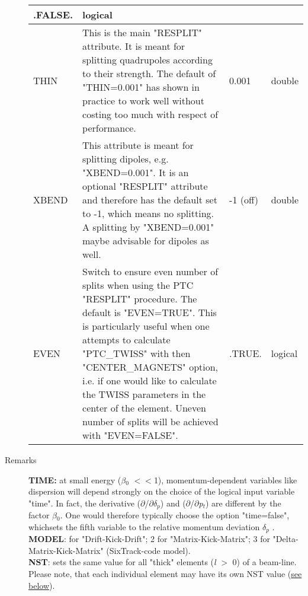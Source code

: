 \begin{description}
\begin{longtable}{l p{8cm} p{2cm} p{2cm}}
.FALSE. & logical \\
\hline
 THIN & 
   This is the main "RESPLIT" attribute. It is meant        for splitting quadrupoles according to their strength. The default        of "THIN=0.001" has shown in practice to        work well without costing too much with respect of performance.  & 
0.001 & double \\
\hline
XBEND & 
   This attribute is meant for splitting dipoles, e.g. "XBEND=0.001". It is an optional "RESPLIT" attribute and therefore has the        default set to -1, which means no splitting. A splitting by "XBEND=0.001" maybe advisable for dipoles        as well.  & 
-1 (off) & double \\
\hline
 EVEN & 
  Switch to ensure even number of splits when using the PTC "RESPLIT" procedure. The default is "EVEN=TRUE". This is particularly useful        when one attempts to calculate "PTC\_TWISS" with then "CENTER\_MAGNETS" option, i.e. if one        would like to calculate the TWISS parameters in the center of        the element. Uneven number of splits will be achieved with "EVEN=FALSE". & 
.TRUE. & logical \\
\hline
\end{longtable}
 
	\item[Remarks] 
	\text{ \\}
		
    \textbf{TIME:} at small energy ($\beta$$_0$  $<$$<$1), momentum-dependent variables like dispersion will depend  strongly on the choice of  the logical input variable "time".  In fact, the derivative ($\partial$/$\partial$\textit{$\delta$}$_\textit{p}$)  and ($\partial$/$\partial$\textit{p}$_\textit{t}$)  are different by the factor \textit{$\beta$}$_0$. One would  therefore typically  choose the option "time=false",  which\nolinebreak sets the fifth variable to the relative momentum deviation \textit{$ \delta_p$ }.\\ 
    
	\textbf{MODEL}:\nolinebreak{} for "Drift-Kick-Drift"; 2 for "Matrix-Kick-Matrix"; 3 for  "Delta-Matrix-Kick-Matrix" (SixTrack-code model).\\
	
	\textbf{NST}: sets the same value  for all "thick" elements (\textit{l }$>$ 0) of a beam-line.  Please note, that each individual element may have its own NST  value (\hyperlink{individual}{see below}).\\

\end{description}
